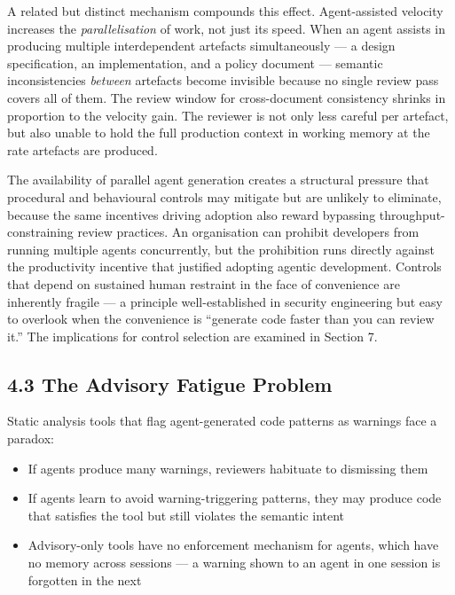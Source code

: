\documentclass[a4paper,11pt]{report}
\providecommand{\tightlist}{%
  \setlength{\itemsep}{0pt}\setlength{\parskip}{0pt}}
\begin{document}
A related but distinct mechanism compounds this effect. Agent-assisted
velocity increases the \emph{parallelisation} of work, not just its
speed. When an agent assists in producing multiple interdependent
artefacts simultaneously --- a design specification, an implementation,
and a policy document --- semantic inconsistencies \emph{between}
artefacts become invisible because no single review pass covers all of
them. The review window for cross-document consistency shrinks in
proportion to the velocity gain. The reviewer is not only less careful
per artefact, but also unable to hold the full production context in
working memory at the rate artefacts are produced.

The availability of parallel agent generation creates a structural
pressure that procedural and behavioural controls may mitigate but are
unlikely to eliminate, because the same incentives driving adoption also
reward bypassing throughput-constraining review practices. An
organisation can prohibit developers from running multiple agents
concurrently, but the prohibition runs directly against the productivity
incentive that justified adopting agentic development. Controls that
depend on sustained human restraint in the face of convenience are
inherently fragile --- a principle well-established in security
engineering but easy to overlook when the convenience is ``generate code
faster than you can review it.'' The implications for control selection
are examined in Section 7.

\hypertarget{the-advisory-fatigue-problem}{%
\subsection{4.3 The Advisory Fatigue
Problem}\label{the-advisory-fatigue-problem}}

Static analysis tools that flag agent-generated code patterns as
warnings face a paradox:

\begin{itemize}
\tightlist
\item
  If agents produce many warnings, reviewers habituate to dismissing
  them
\item
  If agents learn to avoid warning-triggering patterns, they may produce
  code that satisfies the tool but still violates the semantic intent
\item
  Advisory-only tools have no enforcement mechanism for agents, which
  have no memory across sessions --- a warning shown to an agent in one
  session is forgotten in the next
\end{itemize}
\end{document}
